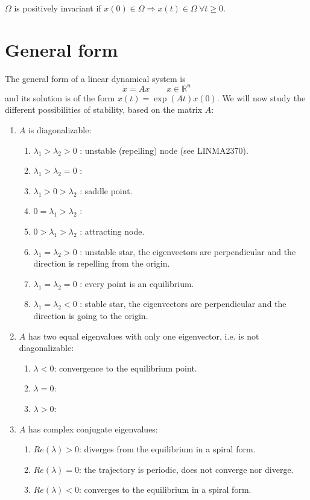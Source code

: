 \documentclass[12pt, openany]{report}
\theoremstyle{definition}
\begin{document}
\(\Omega\) is positively invariant if \(x(0)\in \Omega\Longrightarrow x(t)\in \Omega \: \forall t\ge 0\). 
\section{General form}
The general form of a linear dynamical system is 
\begin{equation}
    \dot x=Ax \qquad x\in \mathbb{R}^n
\end{equation}
and its solution is of the form \(x(t) = \exp(At)x(0)\). We will now study the different possibilities of stability, based on the matrix \(A\):
\begin{enumerate}
    \item \(A\) is diagonalizable:
    \begin{enumerate}
        \item \(\lambda_1>\lambda_2>0\) : unstable (repelling) node (see LINMA2370).
        \item \(\lambda_1>\lambda_2=0\) : 
        \item \(\lambda_1>0>\lambda_2\) : saddle point.
        \item \(0=\lambda_1>\lambda_2\) : 
        \item \(0>\lambda_1>\lambda_2\) : attracting node.
        \item \(\lambda_1=\lambda_2>0\) : unstable star, the eigenvectors are perpendicular and the direction is repelling from the origin.
        \item \(\lambda_1=\lambda_2=0\) : every point is an equilibrium.
        \item \(\lambda_1=\lambda_2<0\) : stable star, the eigenvectors are perpendicular and the direction is going to the origin.
    \end{enumerate}
    \item \(A\) has two equal eigenvalues with only one eigenvector, i.e. is not diagonalizable:
    \begin{enumerate}
        \item \(\lambda<0\): convergence to the equilibrium point.
        \item \(\lambda=0\): 
        \item \(\lambda>0\):
    \end{enumerate}
    \item \(A\) has complex conjugate eigenvalues:
    \begin{enumerate}
        \item \(Re(\lambda)>0\): diverges from the equilibrium in a spiral form.
        \item \(Re(\lambda)=0\): the trajectory is periodic, does not converge nor diverge.
        \item \(Re(\lambda)<0\): converges to the equilibrium in a spiral form.
    \end{enumerate}
\end{enumerate}
\end{document}
